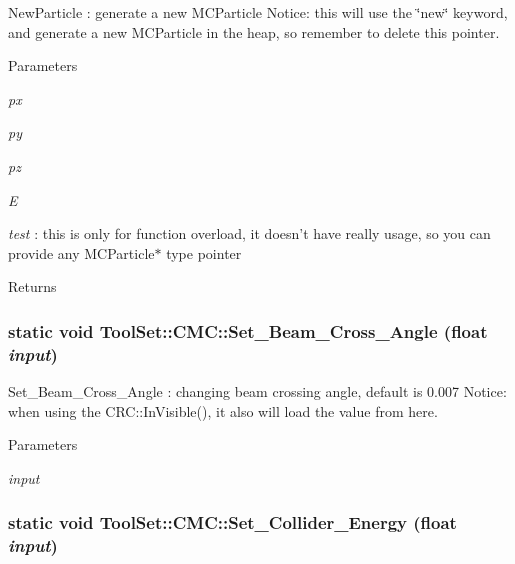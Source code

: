 NewParticle : generate a new MCParticle Notice: this will use the \char`\"{}new\char`\"{} keyword, and generate a new MCParticle in the heap, so remember to delete this pointer. 
\begin{DoxyParams}{Parameters}
\item[{\em px}]\item[{\em py}]\item[{\em pz}]\item[{\em E}]\item[{\em test}]: this is only for function overload, it doesn't have really usage, so you can provide any MCParticle$\ast$ type pointer\end{DoxyParams}
\begin{DoxyReturn}{Returns}

\end{DoxyReturn}
\hypertarget{classToolSet_1_1CMC_a6d72918adb583b9dcaee3c0c9166f6cb}{
\subsubsection[{Set\_\-Beam\_\-Cross\_\-Angle}]{\setlength{\rightskip}{0pt plus 5cm}static void ToolSet::CMC::Set\_\-Beam\_\-Cross\_\-Angle (float {\em input})}}
\label{classToolSet_1_1CMC_a6d72918adb583b9dcaee3c0c9166f6cb}


Set\_\-Beam\_\-Cross\_\-Angle : changing beam crossing angle, default is 0.007 Notice: when using the CRC::InVisible(), it also will load the value from here. 
\begin{DoxyParams}{Parameters}
\item[{\em input}]\end{DoxyParams}
\hypertarget{classToolSet_1_1CMC_a2b939b1fd1e396eb5764c512903fe229}{
\subsubsection[{Set\_\-Collider\_\-Energy}]{\setlength{\rightskip}{0pt plus 5cm}static void ToolSet::CMC::Set\_\-Collider\_\-Energy (float {\em input})}}
\label{classToolSet_1_1CMC_a2b939b1fd1e396eb5764c512903fe229}


